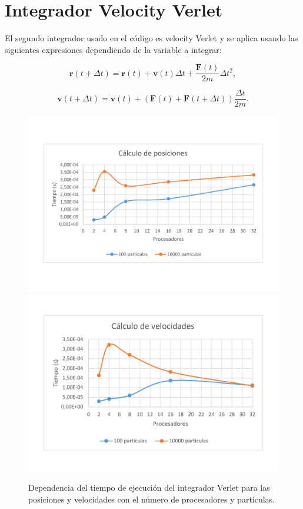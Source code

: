 \documentclass[onecolumn]{article}
\renewcommand{\vec}[1]{\mathbf{#1}}
\begin{document}
\section{Integrador Velocity Verlet}

El segundo integrador usado en el código es velocity Verlet y se aplica usando las siguientes expresiones dependiendo de la variable a integrar:

\begin{equation}
\vec{r}(t+\Delta t) = \vec{r}(t) + \vec{v}(t)\Delta t + \frac{\vec{F}(t)}{2m}\Delta t^2 ,
\end{equation}

\begin{equation}
\vec{v}(t+\Delta t) = \vec{v}(t) + \left( \vec{F}(t)  + \vec{F}(t+\Delta t)\right) \frac{\Delta t}{2m} .
\end{equation}

 \begin{figure}[h!]
	\includegraphics[scale=0.4]{posiciones_verlet.pdf}
	\includegraphics[scale=0.4]{velocidades_verlet.pdf}
	\caption{Dependencia del tiempo de ejecución del integrador Verlet para las posiciones y velocidades con el número de procesadores y partículas.}
\end{figure}
\end{document}

